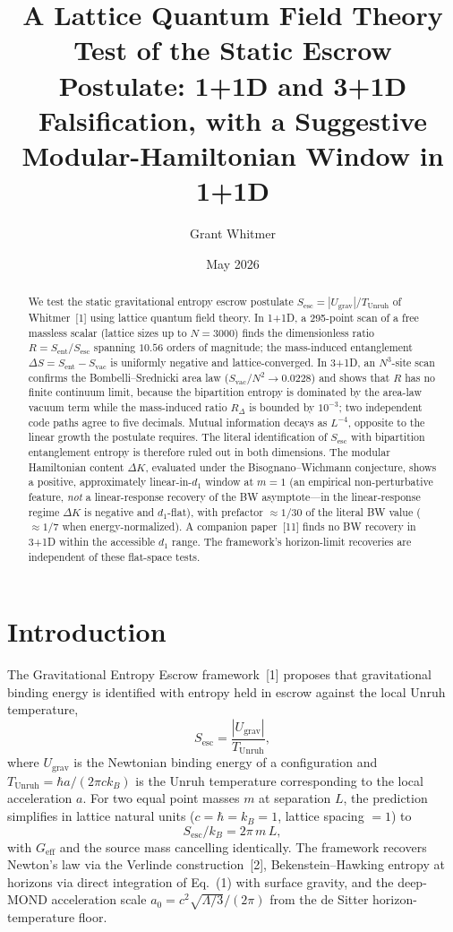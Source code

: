 \documentclass[11pt]{article}
\title{A Lattice Quantum Field Theory Test of the Static Escrow\\[2pt]
\large Postulate: 1+1D and 3+1D Falsification, with a Suggestive\\
Modular-Hamiltonian Window in 1+1D}
\author{Grant Whitmer}
\date{May 2026}
\newcommand{\Sesc}{S_{\mathrm{esc}}}
\newcommand{\Sent}{S_{\mathrm{ent}}}
\newcommand{\Svac}{S_{\mathrm{vac}}}
\newcommand{\Tu}{T_{\mathrm{Unruh}}}
\begin{document}
\maketitle

\begin{abstract}
We test the static gravitational entropy escrow postulate
$\Sesc = |U_{\mathrm{grav}}|/\Tu$ of Whitmer~[1] using lattice quantum field theory. In 1+1D, a
295-point scan of a free massless scalar (lattice sizes up to $N = 3000$) finds the dimensionless
ratio $R = \Sent/\Sesc$ spanning $10.56$ orders of magnitude; the mass-induced entanglement
$\Delta S = \Sent - \Svac$ is uniformly negative and lattice-converged. In 3+1D, an $N^{3}$-site scan
confirms the Bombelli--Srednicki area law ($\Svac/N^{2} \to 0.0228$) and shows that $R$ has no finite
continuum limit, because the bipartition entropy is dominated by the area-law vacuum term while the
mass-induced ratio $R_{\Delta}$ is bounded by $10^{-3}$; two independent code paths agree to five
decimals. Mutual information decays as $L^{-4}$, opposite to the linear growth the postulate requires.
The literal identification of $\Sesc$ with bipartition entanglement entropy is therefore ruled out in
both dimensions. The modular Hamiltonian content $\Delta K$, evaluated under the
Bisognano--Wichmann conjecture, shows a positive, approximately linear-in-$d_{1}$ window at $m=1$
(an empirical non-perturbative feature, \emph{not} a linear-response recovery of the BW asymptote---in
the linear-response regime $\Delta K$ is negative and $d_{1}$-flat), with prefactor $\approx 1/30$ of the
literal BW value ($\approx 1/7$ when energy-normalized). A companion paper~[11] finds no BW recovery
in 3+1D within the accessible $d_{1}$ range. The framework's horizon-limit recoveries are independent
of these flat-space tests.
\end{abstract}

\section{Introduction}

The Gravitational Entropy Escrow framework~[1] proposes that gravitational binding energy is
identified with entropy held in escrow against the local Unruh temperature,
\begin{equation}
  \Sesc = \frac{|U_{\mathrm{grav}}|}{\Tu},
\end{equation}
where $U_{\mathrm{grav}}$ is the Newtonian binding energy of a configuration and
$\Tu = \hbar a/(2\pi c k_{B})$ is the Unruh temperature corresponding to the local acceleration $a$.
For two equal point masses $m$ at separation $L$, the prediction simplifies in lattice natural units
($c = \hbar = k_{B} = 1$, lattice spacing $= 1$) to
\begin{equation}
  \Sesc/k_{B} = 2\pi\,m\,L,
\end{equation}
with $G_{\mathrm{eff}}$ and the source mass cancelling identically. The framework recovers Newton's law
via the Verlinde construction~[2], Bekenstein--Hawking entropy at horizons via direct integration of
Eq.~(1) with surface gravity, and the deep-MOND acceleration scale
$a_{0} = c^{2}\sqrt{\Lambda/3}/(2\pi)$ from the de Sitter horizon-temperature floor.
\end{document}
